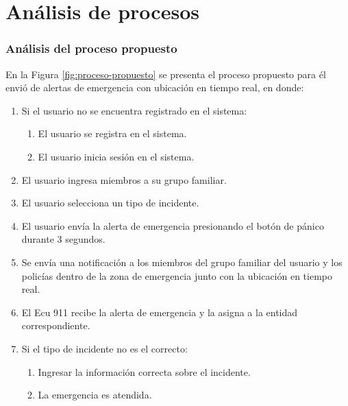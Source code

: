 \section{Análisis de procesos}

\subsubsection{Análisis del proceso propuesto}

En la Figura \ref{fig:proceso-propuesto} se presenta el proceso propuesto para él envió de alertas de emergencia con
ubicación en tiempo real, en donde:

\begin{enumerate}
    \item Si el usuario no se encuentra registrado en el sistema:
          \begin{enumerate}
              \item El usuario se registra en el sistema.
              \item El usuario inicia sesión en el sistema.
          \end{enumerate}
    \item El usuario ingresa miembros a su grupo familiar.
    \item El usuario selecciona un tipo de incidente.
    \item El usuario envía la alerta de emergencia presionando el botón de pánico durante 3 segundos.
    \item Se envía una notificación a los miembros del grupo familiar del usuario y los policías dentro de la zona de emergencia junto con la ubicación en tiempo real.
    \item El Ecu 911 recibe la alerta de emergencia y la asigna a la entidad correspondiente.
    \item Si el tipo de incidente no es el correcto:
          \begin{enumerate}
              \item Ingresar la información correcta sobre el incidente.
              \item La emergencia es atendida.
          \end{enumerate}
\end{enumerate}

